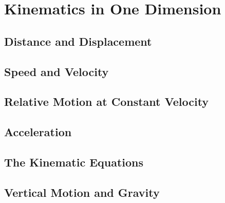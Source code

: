 \chapter{Kinematics in One Dimension}
\section{Distance and Displacement}
\section{Speed and Velocity}
\section{Relative Motion at Constant Velocity}
\section{Acceleration}
\section{The Kinematic Equations}
\section{Vertical Motion and Gravity}


